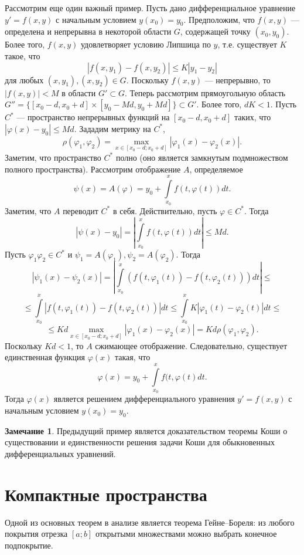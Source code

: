 \documentclass[12pt, titlepage, oneside]{amsbook}
\theoremstyle{definition}
\newtheorem{remark}[theorem]{Замечание}
\theoremstyle{remark}
\begin{document}
Рассмотрим еще один важный пример. Пусть дано дифференциальное уравнение $y'=f(x,y)$ с начальным условием $y(x_0)=y_0$. Предположим, что $f(x,y)$ --- определена и непрерывна в некоторой области $G$, содержащей точку $(x_0,y_0)$. Более того, $f(x,y)$ удовлетворяет условию Липшица по $y$, т.е. существует $K$ такое, что $$|f(x,y_1)-f(x,y_2)|\leq K|y_1-y_2|$$ для любых $(x,y_1), (x,y_2)\in G$. Поскольку $f(x,y)$ --- непрерывно, то $|f(x,y)|<M$ в области $G'\subset G$. Теперь рассмотрим прямоугольную область $G''=\{[x_0-d,x_0+d]\times[y_0-Md,y_0+Md]\}\subset G'$. Более того, $dK<1$. Пусть $C^*$ --- пространство непрерывных функций на $[x_0-d,x_0+d]$ таких, что $|\varphi(x)-y_0|\leq Md$. Зададим метрику на $C^*$, $$\rho(\varphi_1,\varphi_2)=\max\limits_{x\in[x_0-d;x_0+d]}|\varphi_1(x)-\varphi_2(x)|.$$ Заметим, что пространство $C^*$ полно (оно является замкнутым подмножеством полного пространства).
Рассмотрим отображение $A$, определяемое $$\psi(x)=A(\varphi)=y_0+\int\limits_{x_0}^x f(t,\varphi(t))dt.$$ Заметим, что $A$ переводит $C^*$ в себя. Действительно, пусть $\varphi\in C^*$. Тогда $$|\psi(x)-y_0|=\left|\int\limits_{x_0}^x f(t,\varphi(t))dt\right|\leq M d.$$ Пусть $\varphi_1 \varphi_2\in C^*$ и $\psi_1=A(\varphi_1), \psi_2=A(\varphi_2)$. Тогда $$|\psi_1(x)-\psi_2(x)|=\left|\int\limits_{x_0}^x (f(t,\varphi_1(t))-f(t,\varphi_2(t)))dt\right|\leq$$ $$\leq\int\limits_{x_0}^x |f(t,\varphi_1(t))-f(t,\varphi_2(t))|dt\leq\int\limits_{x_0}^x K|\varphi_1(t)-\varphi_2(t)|dt\leq$$ $$\leq Kd\max\limits_{x\in[x_0-d;x_0+d]}|\varphi_1(x)-\varphi_2(x)|=Kd\rho(\varphi_1,\varphi_2).$$ Поскольку $Kd<1$, то $A$ сжимающее отображение. Следовательно, существует единственная функция $\varphi(x)$ такая, что $$\varphi(x)=y_0+\int\limits_{x_0}^x f(t,\varphi(t)dt.$$ Тогда $\varphi(x)$ является решением дифференциального уравнения $y'=f(x,y)$ с начальным условием $y(x_0)=y_0$.

\begin{remark}
	Предыдущий пример является доказательством теоремы Коши о существовании и единственности решения задачи Коши для обыкновенных дифференциальных уравнений.
\end{remark}

\section{Компактные пространства}

Одной из основных теорем в анализе является теорема Гейне--Бореля: из любого покрытия отрезка $[a;b]$ открытыми множествами можно выбрать конечное подпокрытие.
\end{document}
